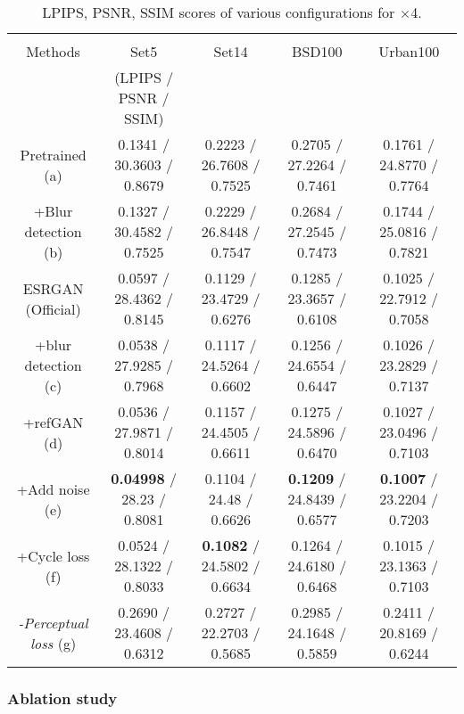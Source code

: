 \documentclass{article}
\begin{document}
\begin{table}
    \centering
    \caption{LPIPS, PSNR, SSIM scores of various configurations for $\times$4.}
    \label{tab_numerical_geo}
    \resizebox{\textwidth}{!}
    {\begin{tabular}{|c|c|c|c|c|}
        \hline
        & & & & \\
        Methods & Set5 & Set14 & BSD100 & Urban100 \\
        & (LPIPS / PSNR / SSIM) & & & \\
        \hline
        Pretrained (a) & 0.1341 / 30.3603 / 0.8679 & 0.2223 / 26.7608 / 0.7525 & 0.2705 / 27.2264 / 0.7461 & 0.1761 / 24.8770 / 0.7764 \\[1mm]
        +Blur detection (b) & 0.1327 / 30.4582 / 0.7525 & 0.2229 / 26.8448 / 0.7547 & 0.2684 / 27.2545 / 0.7473 & 0.1744 / 25.0816 / 0.7821 \\[1mm]
        \hline
        ESRGAN (Official) & 0.0597 / 28.4362 / 0.8145 & 0.1129 / 23.4729 / 0.6276 & 0.1285 / 23.3657 / 0.6108 & 0.1025 / 22.7912 / 0.7058 \\[1mm]
        \hline
        +blur detection (c) & 0.0538 / 27.9285 / 0.7968 & 0.1117 / 24.5264 / 0.6602 & 0.1256 / 24.6554 / 0.6447 & 0.1026 / 23.2829 / 0.7137 \\[1mm]
        +refGAN (d) & 0.0536 / 27.9871 / 0.8014 & 0.1157 / 24.4505 / 0.6611 & 0.1275 / 24.5896 / 0.6470 & 0.1027 / 23.0496 / 0.7103 \\[1mm]
        +Add noise (e) & \textbf{0.04998} / 28.23 / 0.8081 & 0.1104 / 24.48 / 0.6626 & \textbf{0.1209} / 24.8439 / 0.6577 & \textbf{0.1007} / 23.2204 / 0.7203 \\[1mm]
        +Cycle loss (f) & 0.0524 / 28.1322 / 0.8033 & \textbf{0.1082} / 24.5802 / 0.6634 & 0.1264 / 24.6180 / 0.6468 & 0.1015 / 23.1363 / 0.7103 \\[1mm]
        \textit{-Perceptual loss} (g) & 0.2690 / 23.4608 / 0.6312 & 0.2727 / 22.2703 / 0.5685 & 0.2985 / 24.1648 / 0.5859 & 0.2411 / 20.8169 / 0.6244 \\[1mm]
        \hline
    \end{tabular}
    }
    \label{tab:my_label}
\end{table}

\subsubsection{Ablation study}
\end{document}
